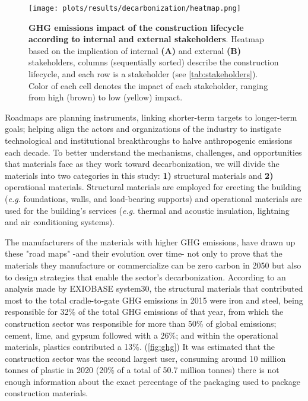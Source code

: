 \begin{figure}[ht!]
  \centering
  \texttt{[image: plots/results/decarbonization/heatmap.png]}
  \caption[GHG emissions impact of the construction lifecycle according to internal and external stakeholders]{\textbf{GHG emissions impact of the construction lifecycle according to internal and external stakeholders}. Heatmap based on the implication of internal \textbf{(A)} and external \textbf{(B)} stakeholders, columns (sequentially sorted) describe the construction lifecycle, and each row is a stakeholder (see \autoref{tab:stakeholders}). Color of each cell denotes the impact of each stakeholder, ranging from high (brown) to low (yellow) impact.}
  \label{fig:heatmap}
\end{figure}

Roadmaps are planning instruments, linking shorter-term targets to longer-term goals; helping align the actors and organizations of the industry to instigate technological and institutional breakthroughs to halve anthropogenic emissions each decade.\autocite{rockstrom2017roadmap} To better understand the mechanisms, challenges, and opportunities that materials face as they work toward decarbonization, we will divide the materials into two categories in this study: \textbf{1)} structural materials and \textbf{2)} operational materials. Structural materials are employed for erecting the building (\textit{e.g.} foundations, walls, and load-bearing supports) and operational materials are used for the building’s services (\textit{e.g.} thermal and acoustic insulation, lightning and air conditioning systems).

The manufacturers of the materials with higher GHG emissions, have drawn up these "road maps" -and their evolution over time- not only to prove that the materials they manufacture or commercialize can be zero carbon in 2050 but also to design strategies that enable the sector’s decarbonization.\autocite{aus_2022} According to an analysis made by EXIOBASE system30, the structural materials that contributed most to the total cradle-to-gate GHG emissions in 2015 were iron and steel, being responsible for 32\% of the total GHG emissions of that year, from which the construction sector was responsible for more than 50\% of global emissions;\autocite{worldsteelassociation_2020} cement, lime, and gypsum followed with a 26\%; and within the operational materials, plastics contributed a 13\%.\autocite{hertwich2019material} (\autoref{fig:ghg}) It was estimated that the construction sector was the second largest user, consuming around 10 million tonnes of plastic in 2020 (20\% of a total of 50.7 million tonnes\autocite{plasticseurpo_2021}) there is not enough information about the exact percentage of the packaging used to package construction materials.\autocite{geyer2017production}

